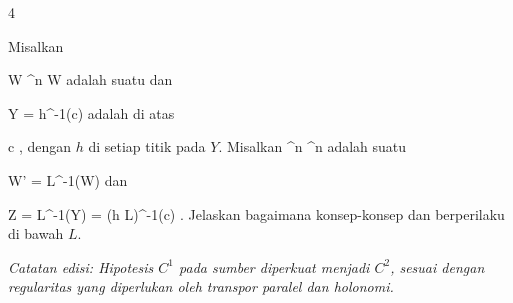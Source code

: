 {4}
{

Misalkan

\mavergleichskette
{\vergleichskette
{ W
}
{ \subseteq }{ \R^n
}
{  }{
}
{    }{
}
{   }{
}
}
{}{}{}
 { W } { \R
} {}
adalah suatu
dan

\mavergleichskette
{\vergleichskette
{ Y
}
{ = }{ h^{-1}(c)
}
{  }{
}
{    }{
}
{   }{
}
}
{}{}{}
adalah
di atas

\mavergleichskette
{\vergleichskette
{ c
}
{ \in }{ \R
}
{  }{
}
{    }{
}
{   }{
}
}
{}{}{,}
dengan $h$
di setiap titik pada $Y$. Misalkan
 {\R^n } { \R^n
} {}
adalah suatu

\mavergleichskette
{\vergleichskette
{ W'
}
{ = }{ L^{-1}(W)
}
{  }{
}
{    }{
}
{   }{
}
}
{}{}{}
dan

\mavergleichskettedisp
{\vergleichskette
{ Z
}
{ =} { L^{-1}(Y)
}
{ =} { (h \circ L)^{-1}(c)
}
{ } {
}
{ } {
}
}
{}{}{.}
Jelaskan bagaimana konsep-konsep
dan
berperilaku di bawah $L$.

\emph{Catatan edisi: Hipotesis $C^1$ pada sumber diperkuat menjadi $C^2$, sesuai dengan regularitas yang diperlukan oleh transpor paralel dan holonomi.}

}
{} {}
